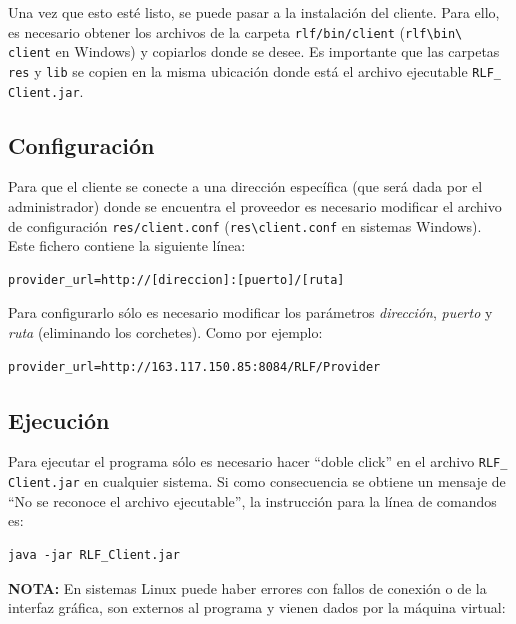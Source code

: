 Una vez que esto esté listo, se puede pasar a la instalación del 
cliente. Para ello, es necesario obtener los archivos de la carpeta 
\texttt{rlf/bin/client} (\texttt{rlf\textbackslash bin\textbackslash 
client} en Windows) y copiarlos donde se desee. Es importante que las 
carpetas \texttt{res} y \texttt{lib} se copien en la misma ubicación 
donde está el archivo ejecutable \texttt{RLF\_ Client.jar}.

\subsection*{Configuración}
Para que el cliente se conecte a una dirección específica (que será 
dada por el administrador) donde se encuentra el proveedor es 
necesario modificar el archivo de configuración 
\texttt{res/client.conf} (\texttt{res\textbackslash client.conf} en sistemas 
Windows). Este fichero contiene la siguiente línea:

\begin{verbatim}
provider_url=http://[direccion]:[puerto]/[ruta]
\end{verbatim}

Para configurarlo sólo es necesario modificar los parámetros 
\emph{dirección}, \emph{puerto} y \emph{ruta} (eliminando los corchetes). 
Como por ejemplo:

\begin{verbatim}
provider_url=http://163.117.150.85:8084/RLF/Provider
\end{verbatim}

\subsection*{Ejecución}
Para ejecutar el programa sólo es necesario hacer ``doble click'' en el 
archivo \texttt{RLF\_ Client.jar} en cualquier sistema. Si como 
consecuencia se obtiene un mensaje de ``No se reconoce el archivo 
ejecutable'', la instrucción para la línea de comandos es:

\begin{verbatim}
java -jar RLF_Client.jar
\end{verbatim}

\textbf{NOTA:} En sistemas Linux puede haber errores con fallos de 
conexión o de la interfaz gráfica, son externos al programa y vienen 
dados por la máquina virtual:

